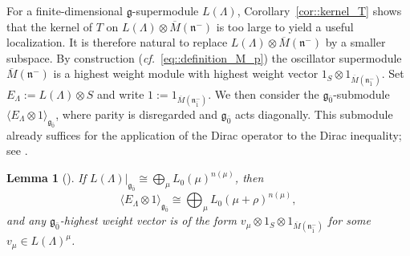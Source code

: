 \documentclass[11pt]{amsart}
\newcommand{\End}{\operatorname{End}}
\def\CC{{\mathbb C}}
\def\even{{\mathfrak{g}_{\bar{0}}}}
\def\nn {{\mathfrak{n}}}
\def\gg{{\mathfrak{g}}}
\theoremstyle{plain}
\newtheorem{lemma}[theorem]{Lemma}
\theoremstyle{remark}
\theoremstyle{definition}
\numberwithin{equation}{section}
\theoremstyle{remark}
\begin{document}

For a finite-dimensional $\gg$-supermodule $L(\Lambda)$, Corollary~\ref{cor::kernel_T} shows that the kernel of $T$ on $L(\Lambda)\otimes \overline{M}(\nn^{-})$ is too large to yield a useful localization. It is therefore natural to replace $L(\Lambda)\otimes \overline{M}(\nn^{-})$ by a smaller subspace. By construction (\emph{cf.}~\eqref{eq::definition_M_p}) the oscillator supermodule $\overline{M}(\nn^{-})$ is a highest weight module with highest weight vector $1_{S}\otimes 1_{\overline{M}(\nn_{\bar{1}}^{-})}$. Set $E_{\Lambda}:=L(\Lambda)\otimes S$ and write $1:=1_{\overline{M}(\nn_{\bar{1}}^{-})}$. We then consider the $\even$-submodule $\langle E_{\Lambda}\otimes 1\rangle_{\even}$, where parity is disregarded and $\even$ acts diagonally. This submodule already suffices for the application of the Dirac operator to the Dirac inequality; see \cite{SchmidtDirac}. 

\begin{lemma}[\cite{SchmidtDirac}] \label{lemm::decomposition_E_1}
    If $L(\Lambda)\big\vert_{\even} \cong \bigoplus_{\mu}L_{0}(\mu)^{n(\mu)}$, then 
   \[
   \langle E_{\Lambda}\otimes 1\rangle_{\even} \cong \bigoplus_{\mu} L_{0}(\mu+\rho)^{n(\mu)},
   \]
   and any $\even$-highest weight vector is of the form $v_{\mu}\otimes 1_{S}\otimes 1_{\overline{M}(\nn_{\bar{1}}^{-})}$ for some $v_{\mu}\in L(\Lambda)^{\mu}$.
\end{lemma}
\end{document}
